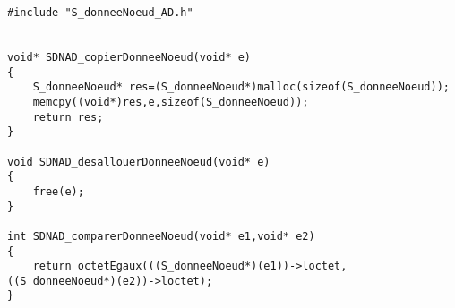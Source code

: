 \begin{verbatim}
#include "S_donneeNoeud_AD.h"


void* SDNAD_copierDonneeNoeud(void* e)
{
	S_donneeNoeud* res=(S_donneeNoeud*)malloc(sizeof(S_donneeNoeud));
	memcpy((void*)res,e,sizeof(S_donneeNoeud));
	return res;
}

void SDNAD_desallouerDonneeNoeud(void* e)
{
	free(e);
}

int SDNAD_comparerDonneeNoeud(void* e1,void* e2)
{
	return octetEgaux(((S_donneeNoeud*)(e1))->loctet, ((S_donneeNoeud*)(e2))->loctet);
}

\end{verbatim}
 
